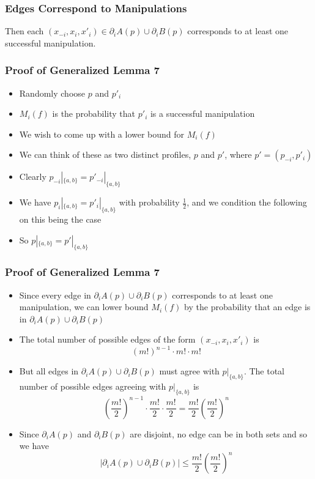 \documentclass[aspectratio=169]{beamer}
\begin{document}
		\begin{frame}
			\frametitle{Edges Correspond to Manipulations}

			\begin{lemma}
				Then each $(x_{-i}, x_i, x'_i) \in \partial_i A(p) \cup \partial_i B(p)$ corresponds to at least one successful manipulation.
			\end{lemma}

		\end{frame}

		\begin{frame}
			\frametitle{Proof of Generalized Lemma 7}

			\begin{itemize}
				\item Randomly choose $p$ and $p'_i$
				\item $M_i(f)$ is the probability that $p'_i$ is a successful manipulation
				\item We wish to come up with a lower bound for $M_i(f)$
				\item We can think of these as two distinct profiles, $p$ and $p'$, where $p' = (p_{-i}, p'_i)$
				\item Clearly $p_{-i}|_{\{a,b\}} = p'_{-i}|_{\{a,b\}}$
				\item We have $p_i|_{\{a,b\}} = p'_i|_{\{a,b\}}$ with probability $\frac{1}{2}$, and we condition the following on this being the case
				\item So $p|_{\{a,b\}} = p'|_{\{a,b\}}$
			\end{itemize}
		\end{frame}

		\begin{frame}
			\frametitle{Proof of Generalized Lemma 7}

			\begin{itemize}
				\item Since every edge in $\partial_i A(p) \cup \partial_i B(p)$ corresponds to at least one manipulation, we can lower bound $M_i(f)$ by the probability that an edge is in $\partial_i A(p) \cup \partial_i B(p)$
				\item The total number of possible edges of the form $(x_{-i}, x_i, x'_i)$ is
					\[
						(m!)^{n-1} \cdot m! \cdot m!
					\]
				\item But all edges in $\partial_i A(p) \cup \partial_i B(p)$ must agree with $p|_{\{a, b\}}$. The total number of possible edges agreeing with $p|_{\{a, b\}}$ is
					\[
						\left(\frac{m!}{2}\right)^{n-1} \cdot \frac{m!}{2} \cdot \frac{m!}{2} = \frac{m!}{2}\left(\frac{m!}{2}\right)^{n}
					\]
				\item Since $\partial_i A(p)$ and $\partial_i B(p)$ are disjoint, no edge can be in both sets and so we have
					\[
						|\partial_i A(p) \cup \partial_i B(p)| \le \frac{m!}{2}\left(\frac{m!}{2}\right)^{n}
					\]
			\end{itemize}
		\end{frame}
\end{document}
